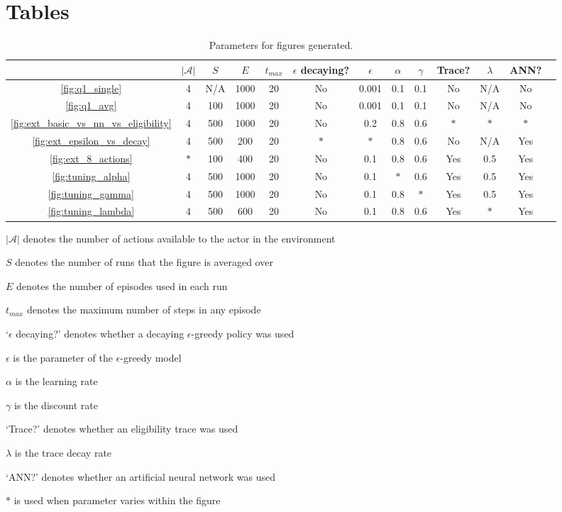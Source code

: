 \documentclass[a4paper, 11pt, twocolumn, final]{article} %
\begin{document}
\section{Tables}
\begin{table}[H]
  \centering
  \begin{tabular}{c | c c c c c c c c c c c c}
    \hline
    & $|\mathcal{A}|$ & $S$ & $E$ & $t_{max}$ & $\epsilon$ decaying? &
      $\epsilon$ & $\alpha$ & $\gamma$ & Trace? & $\lambda$ & ANN? \\
    \hline
    \autoref{fig:q1_single} & 4 & N/A & 1000 & 20 & No & 0.001 & 0.1 & 0.1 &
      No & N/A & No \\
    \autoref{fig:q1_avg} & 4 & 100 & 1000 & 20 & No & 0.001 & 0.1 & 0.1 & No &
      N/A & No \\
    \autoref{fig:ext_basic_vs_nn_vs_eligibility} & 4 & 500 & 1000 & 20 & No &
      0.2 & 0.8 & 0.6 & $*$ & $*$ & $*$ \\
    \autoref{fig:ext_epsilon_vs_decay} & 4 & 500 & 200 & 20 & $*$ & $*$ & 0.8 &
      0.6 & No & N/A & Yes \\
    \autoref{fig:ext_8_actions} & $*$ & 100 & 400 & 20 & No & 0.1 & 0.8 & 0.6
      & Yes & 0.5 & Yes \\
    \autoref{fig:tuning_alpha} & 4 & 500 & 1000 & 20 & No & 0.1 & $*$ & 0.6 &
      Yes & 0.5 & Yes \\
    \autoref{fig:tuning_gamma} & 4 & 500 & 1000 & 20 & No & 0.1 & 0.8 & $*$ &
      Yes & 0.5 & Yes \\
    \autoref{fig:tuning_lambda} & 4 & 500 & 600 & 20 & No & 0.1 & 0.8 & 0.6 &
      Yes & $*$ & Yes \\
    \hline
  \end{tabular}
  \caption{Parameters for figures generated.}
  \label{tab:parameters}
\end{table}

\begin{itemize*}
  \item $|\mathcal{A}|$ denotes the number of actions available to the actor in
    the environment
  \item $S$ denotes the number of runs that the figure is averaged over
  \item $E$ denotes the number of episodes used in each run
  \item $t_{max}$ denotes the maximum number of steps in any episode
  \item `$\epsilon$ decaying?' denotes whether a decaying $\epsilon$-greedy
    policy was used
  \item $\epsilon$ is the parameter of the $\epsilon$-greedy model
  \item $\alpha$ is the learning rate
  \item $\gamma$ is the discount rate
  \item `Trace?' denotes whether an eligibility trace was used
  \item $\lambda$ is the trace decay rate
  \item `ANN?' denotes whether an artificial neural network was used
  \item $*$ is used when parameter varies within the figure
\end{itemize*}
\end{document}
